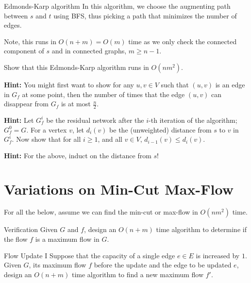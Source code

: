 \documentclass[aspectratio=169]{beamer}
\newcommand{\blankslides}{%
  \begin{frame}[plain]\end{frame}%
}
\begin{document}
\begin{frame}{Edmonds-Karp algorithm}
  \small
  In this algorithm, we choose the augmenting path between $s$ and $t$ using BFS, thus picking a path that minimizes the number of edges.

  \medskip
  Note, this runs in $O(n+m) = O(m)$ time as we only check the connected component of $s$ and in connected graphs, $m \ge n-1$.

  \medskip
  Show that this Edmonds-Karp algorithm runs in $O(nm^2)$.

  \medskip
  \textbf{Hint:} You might first want to show for any $u,v \in V$ such that $(u,v)$ is an edge in $G_f$ at some point, then the number of times that the edge $(u,v)$ can disappear from $G_f$ is at most $\frac{n}{2}$.

  \medskip
  \textbf{Hint:} Let $G_f^i$ be the residual network after the $i$-th iteration of the algorithm; $G_f^0 = G$. For a vertex $v$, let $d_i(v)$ be the (unweighted) distance from $s$ to $v$ in $G_f^i$. Now show that for all $i \ge 1$, and all $v \in V$, $d_{i-1}(v) \le d_i(v)$.

  \medskip
  \textbf{Hint:} For the above, induct on the distance from $s$!
\end{frame}
\blankslides

\section{Variations on Min-Cut Max-Flow}

\begin{frame}{}
  For all the below, assume we can find the min-cut or max-flow in $O(nm^2)$ time.
\end{frame}
\blankslides

\begin{frame}{Verification}
  Given $G$ and $f$, design an $O(n+m)$ time algorithm to determine if the flow $f$ is a maximum flow in $G$.
\end{frame}
\blankslides

\begin{frame}{Flow Update I}
  Suppose that the capacity of a single edge $e \in E$ is increased by $1$. Given $G$, its maximum flow $f$ before the update and the edge to be updated $e$, design an $O(n+m)$ time algorithm to find a new maximum flow $f'$.
\end{frame}
\blankslides
\end{document}
